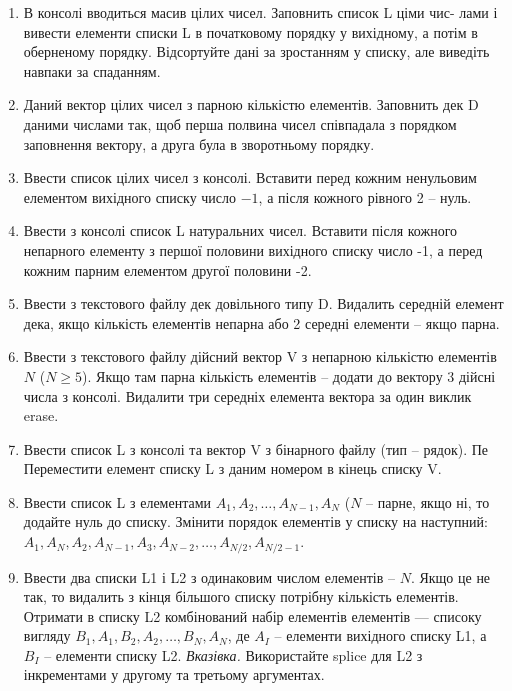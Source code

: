 \documentclass[a5paper,titlepage,openany,twoside,draft]{book_unv}%
\begin{document}
\begin{enumerate}
\item 
В консолі вводиться масив цілих чисел. Заповнить список L ціми чис-
лами і вивести елементи списки L в початковому порядку у вихідному, а 
потім в оберненому порядку. Відсортуйте дані за зростанням у списку, але виведіть
навпаки за спаданням.

\item 
Даний вектор цілих чисел з парною кількістю елементів.
Заповнить дек D даними числами так, щоб перша полвина чисел співпадала
з порядком заповнення вектору, а друга була в зворотньому порядку.
 
\item 
Ввести список цілих чисел з консолі. Вставити перед кожним ненульовим 
елементом вихідного списку число $-1$, а після кожного рівного 2 -- нуль. 
\item 
Ввести з консолі список L натуральних чисел. Вставити після 
кожного непарного елементу з першої половини вихідного списку число -1, а 
перед кожним парним елементом другої половини -2.
\item 
Ввести з текстового файлу дек довільного типу D. Видалить середній елемент дека, якщо 
кількість елементів непарна або 2 середні елементи -- якщо парна. 

\item 
Ввести з текстового файлу дійсний вектор V з непарною кількістю елементів $N$ ($N \ge 5$).
Якщо там парна кількість елементів -- додати до вектору 3 дійсні числа з консолі.
Видалити три середніх елемента вектора за один виклик erase. 

\item 
Ввести список L з консолі та вектор V з бінарного файлу (тип -- рядок). Пе 
Переместити елемент списку L з даним номером в кінець списку V. 

\item 
Ввести список L з елементами $A_1,A_2, \ldots, A_{N-1}, A_N$ ($N$ -- парне,
якщо ні, то додайте нуль до списку.
Змінити порядок елементів у списку на наступний: $A_1, A_N,
A_{2}, A_{N-1}, A_3, A_{N-2}, \ldots, A_{N/2}, A_{N/2-1}$. 

\item 
Ввести два списки L1 і L2 з одинаковим числом елементів -- $N$.
Якщо це не так, то видалить з кінця більшого списку потрібну кількість
елементів. Отримати в списку L2 комбінований набір елементів елементів ---
списоку вигляду $B_1, A_1, B_2, A_2,\ldots, B_N, A_ N$, де $A_I$ --
елементи вихідного списку L1, а $B_I$ -- елементи списку L2.
\emph{Вказівка.} Використайте splice для L2 з інкрементами у другому та третьому аргументах. 

\end{enumerate}
\end{document}
